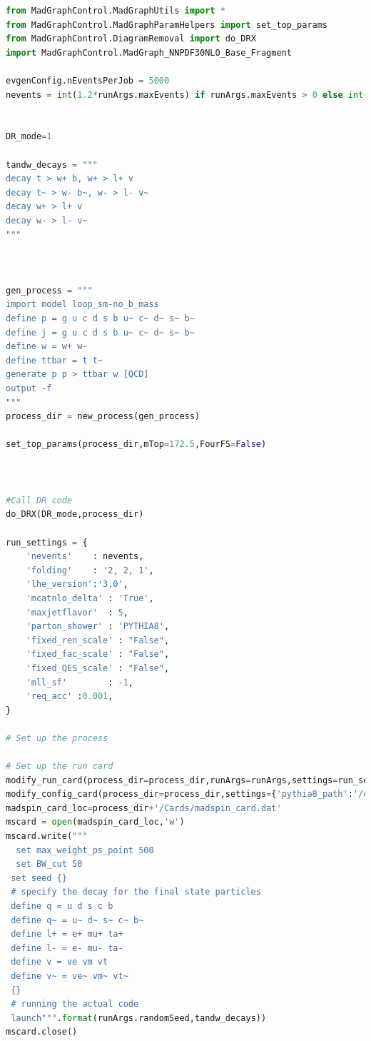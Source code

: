 \documentclass[NOTE, REPORT=true, atlasdraft=true, USenglish]{atlasdoc}
\begin{document}
\clearpage

\begin{lstlisting}[language=python, caption=$tW$ job option python script]
from MadGraphControl.MadGraphUtils import * 
from MadGraphControl.MadGraphParamHelpers import set_top_params
from MadGraphControl.DiagramRemoval import do_DRX
import MadGraphControl.MadGraph_NNPDF30NLO_Base_Fragment

evgenConfig.nEventsPerJob = 5000
nevents = int(1.2*runArgs.maxEvents) if runArgs.maxEvents > 0 else int(1.2*evgenConfig.nEventsPerJob)


DR_mode=1

tandw_decays = """
decay t > w+ b, w+ > l+ v
decay t~ > w- b~, w- > l- v~
decay w+ > l+ v
decay w- > l- v~
"""



gen_process = """
import model loop_sm-no_b_mass
define p = g u c d s b u~ c~ d~ s~ b~
define j = g u c d s b u~ c~ d~ s~ b~
define w = w+ w-
define ttbar = t t~
generate p p > ttbar w [QCD]
output -f
"""
process_dir = new_process(gen_process)

set_top_params(process_dir,mTop=172.5,FourFS=False)



#Call DR code
do_DRX(DR_mode,process_dir)
    
run_settings = { 
    'nevents'    : nevents,
    'folding'    : '2, 2, 1',
    'lhe_version':'3.0',
    'mcatnlo_delta' : 'True',
    'maxjetflavor'  : 5,
    'parton_shower' : 'PYTHIA8',
    'fixed_ren_scale' : "False",
    'fixed_fac_scale' : "False",
    'fixed_QES_scale' : "False",
    'mll_sf'        : -1,
    'req_acc' :0.001,
}

# Set up the process

# Set up the run card
modify_run_card(process_dir=process_dir,runArgs=runArgs,settings=run_settings)
modify_config_card(process_dir=process_dir,settings={'pythia8_path':'/cvmfs/atlas.cern.ch/repo/sw/software/23.6/sw/lcg/releases/MCGenerators/pythia8/309-bb414/x86_64-centos7-gcc11-opt/'})
madspin_card_loc=process_dir+'/Cards/madspin_card.dat'                                                                                                                                   
mscard = open(madspin_card_loc,'w')  
mscard.write("""
  set max_weight_ps_point 500
  set BW_cut 50
 set seed {}
 # specify the decay for the final state particles
 define q = u d s c b
 define q~ = u~ d~ s~ c~ b~
 define l+ = e+ mu+ ta+
 define l- = e- mu- ta-
 define v = ve vm vt
 define v~ = ve~ vm~ vt~
 {}
 # running the actual code
 launch""".format(runArgs.randomSeed,tandw_decays))
mscard.close()



\end{lstlisting}
\end{document}
